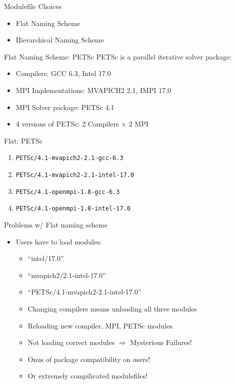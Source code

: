 \documentclass[dvipsnames,aspectratio=169]{beamer}
\begin{document}
\begin{frame}{Modulefile Choices}
  \begin{itemize}
    \item Flat Naming Scheme
    \item Hierarchical Naming Scheme
  \end{itemize}
\end{frame}

\begin{frame}{Flat Naming Scheme: PETSc}
  PETSc is a parallel iterative solver package:
  \begin{itemize}
    \item Compilers: GCC 6.3, Intel 17.0
    \item MPI Implementations: MVAPICH2 2.1, IMPI 17.0
    \item MPI Solver package: PETSc 4.1
    \item 4 versions of PETSc: 2 Compilers $\times$ 2 MPI
  \end{itemize}
\end{frame}

\begin{frame}{Flat: PETSc }
  \begin{enumerate}
  \item \texttt{PETSc/4.1-mvapich2-2.1-gcc-6.3}
  \item \texttt{PETSc/4.1-mvapich2-2.1-intel-17.0}
  \item \texttt{PETSc/4.1-openmpi-1.8-gcc-6.3}
  \item \texttt{PETSc/4.1-openmpi-1.8-intel-17.0}
  \end{enumerate}
\end{frame}

\begin{frame}{Problems w/ Flat naming scheme}
  \begin{itemize}
    \item Users have to load modules:
      \begin{itemize}
        \item ``intel/17.0''
        \item ``mvapich2/2.1-intel-17.0''
        \item ``PETSc/4.1-mvapich2-2.1-intel-17.0''
        \item Changing compilers means unloading all three modules
        \item Reloading new compiler, MPI, PETSc modules.
        \item Not loading correct modules $\Rightarrow$ Mysterious Failures!
        \item Onus of package compatibility on users!
        \item Or extremely compilicated modulefiles!
      \end{itemize}
  \end{itemize}
\end{frame}
\end{document}
